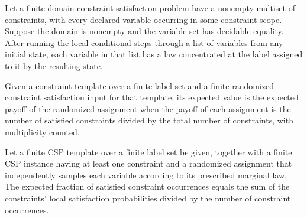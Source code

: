 \begin{theorem}
\label{FABL.CSPInstance.runLocalConditionalSteps_law_eq_pure_assignment}
\leanok
{}
Let a finite-domain constraint satisfaction problem have a nonempty multiset of
constraints, with every declared variable occurring in some constraint scope. Suppose
the domain is nonempty and the variable set has decidable equality. After running the
local conditional steps through a list of variables from any initial state, each
variable in that list has a law concentrated at the label assigned to it by the
resulting state.
\end{theorem}

\begin{definition}
\label{FABL.FiniteRandomizedCSPInput.expectedValue}
\leanok
{}
Given a constraint template over a finite label set and a finite randomized constraint
satisfaction input for that template, its expected value is the expected payoff of the
randomized assignment when the payoff of each assignment is the number of satisfied
constraints divided by the total number of constraints, with multiplicity counted.
\end{definition}

\begin{theorem}
\label{FABL.FiniteRandomizedCSPInput.expectedValue_eq_localExpectedValue}
\leanok
{}
Let a finite CSP template over a finite label set be given, together with a finite CSP
instance having at least one constraint and a randomized assignment that independently
samples each variable according to its prescribed marginal law. The expected fraction of
satisfied constraint occurrences equals the sum of the constraints’ local satisfaction
probabilities divided by the number of constraint occurrences.
\end{theorem}

